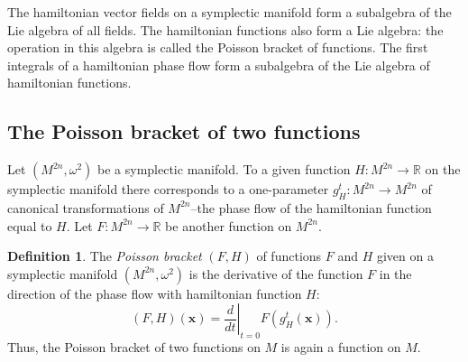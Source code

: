 \documentclass[leqno]{book}
\numberwithin{equation}{section}
\theoremstyle{plain}
\theoremstyle{definition}
\newtheorem*{defn*}{Definition}
\theoremstyle{remark}
\theoremstyle{smallcap}
\numberwithin{prob}{section}
\begin{document}
The hamiltonian vector fields on a symplectic manifold
form a subalgebra of the Lie algebra of all fields.
%
The hamiltonian functions also form a Lie algebra:
the operation in this algebra is called the Poisson bracket
of functions.
%
The first integrals of a hamiltonian phase flow form
a subalgebra of the Lie algebra of hamiltonian functions.


\begin{figure}[h]
  \centering
\end{figure}

\subsection{The Poisson bracket of two functions}

Let $(M^{2n}, \omega^2)$ be a symplectic manifold.
To a given function $H: M^{2n} \rightarrow \mathbb R$
on the symplectic manifold
there corresponds to a one-parameter
$g_H^t: M^{2n} \rightarrow M^{2n}$
of canonical transformations of $M^{2n}$--the
phase flow of the hamiltonian function equal to $H$.
%
Let $F: M^{2n} \rightarrow \mathbb R$
be another function on $M^{2n}$.

\begin{defn*}
  The \emph{Poisson bracket} $(F, H)$ of functions $F$ and $H$
  given on a symplectic manifold $(M^{2n}, \omega^2)$
  is the derivative of the function $F$ in the direction of
  the phase flow with hamiltonian function $H$:
  $$
  (F, H)(\mathbf x)
  =
  \left. \frac{ d }{ dt } \right|_{t = 0}
  F( g_H^t( \mathbf x ) ).
  $$
  Thus, the Poisson bracket of two functions on $M$ is again
  a function on $M$.
\end{defn*}
\end{document}
